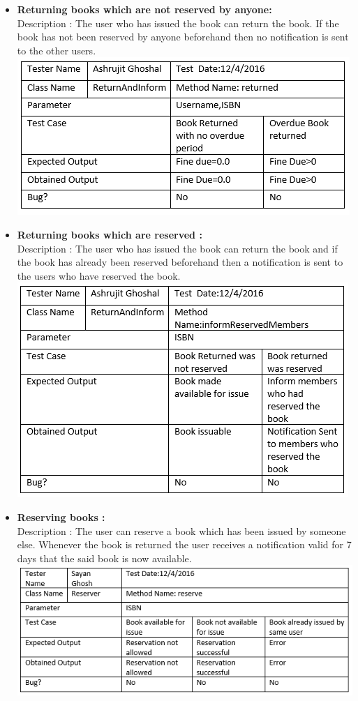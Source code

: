 \documentclass{article}
\begin{document}
\begin{itemize}
	\item \textbf{Returning books which are not reserved by anyone:} \\
	
	Description : The user who has issued the book can return the book. If the book has not been reserved by anyone beforehand then no notification is sent to the other users.\\
	\includegraphics[scale=0.8]{images/Tables/ReturnAndInform.PNG}
	
	\item \textbf{Returning books which are reserved :} \\
	Description : The user who has issued the book can return the book and if the book has already been reserved beforehand then a notification is sent to the users who have reserved the book.\\
	\includegraphics[scale=0.8]{images/Tables/ReturnAndInform2.PNG}
	
	\item \textbf{Reserving books :} \\
	Description : The user can reserve a book which has been issued by someone else. Whenever the book is returned the user receives a notification valid for 7 days that the said book is now available.\\
	\includegraphics[scale=0.8]{images/Tables/Reserver.PNG}
	

\end{itemize}
\end{document}
